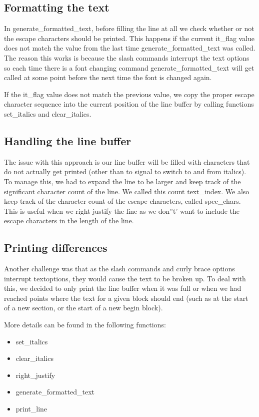 \subsection{Formatting the text}
In generate_formatted_text, before filling the line at all we check whether or not the 
escape characters should be printed. This happens if the current it_flag value does not
match the value from the last time generate_formatted_text was called. The reason this works is because the slash commands interrupt the text options so each time there is a 
font changing command generate_formatted_text will get called at some point before the next 
time the font is changed again.

If the it_flag value does not match the previous value, we copy the proper escape character
sequence into the current position of the line buffer by calling functions set_italics and 
clear_italics.

\subsection{Handling the line buffer}
The issue with this approach is our line buffer will be filled with characters that do not
actually get printed (other than to signal to switch to and from italics). To manage this,
we had to expand the line to be larger and keep track of the significant character count
of the line. We called this count text_index. We also keep track of the character count
of the escape characters, called spec_chars. This is useful when we right justify the line
as we don''t' want to include the escape characters in the length of the line.

\subsection{Printing differences}
Another challenge was that as the slash commands and curly brace options interrupt
textoptions, they would cause the text to be broken up. To deal with this, we decided
to only print the line buffer when it was full or when we had reached points where the
text for a given block should end (such as at the start of a new section, or the start
of a new begin block). 

More details can be found in the following functions:
\begin{itemize}
\item set_italics
\item clear_italics
\item right_justify
\item generate_formatted_text
\item print_line
\end{itemize}

